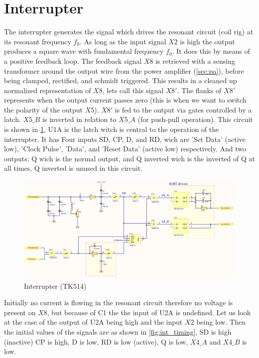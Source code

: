 \newpage
\section{Interrupter}
\label{sec:interrupter}

The interrupter generates the signal which drives the resonant circuit (coil rig) at its resonant frequency $f_0$. As long as the input signal $X2$ is high the output produces a square wave with fundamental frequency $f_0$. It does this by means of a positive feedback loop. The feedback signal $X8$ is retrieved with a sensing transformer around the output wire from the power amplifier (\cref{sec:pa}), before being clamped, rectified, and schmidt triggered. This results in a cleaned up normalized representation of $X8$, lets call this signal $X8'$. The flanks of $X8'$ represents when the output current passes zero (this is when we want to switch the polarity of the output $X5$). $X8'$ is fed to the output via gates controlled by a latch. $X5\_B$ is inverted in relation to $X5\_A$ (for push-pull operation). This circuit is shown in \cref{fig:interrupter}, U1A is the latch witch is central to the operation of the interrupter. It has Four inputs SD, CP, D, and RD, wich are 'Set Data' (active low), 'Clock Pulse', 'Data', and 'Reset Data' (active low) respectively. And two outputs; Q wich is the normal output, and Q inverted wich is the inverted of Q at all times, Q inverted is unused in this circuit.

\begin{figure}[H]
    \centering
    \includegraphics[width=0.9\textheight,angle=-90]{Skjema/TK514_Interrupter.pdf}
    \caption{Interrupter (TK514)}
    \label{fig:interrupter}
\end{figure}

\newpage

Initially no current is flowing in the resonant circuit therefore no voltage is present on $X8$, but because of C1 the the input of U2A is undefined. Let us look at the case of the output of U2A being high and the input $X2$ being low. Then the initial values of the signals are as shown in \cref{fig:int_timing}, SD is high (inactive) CP is high, D is low, RD is low (active), Q is low, $X4\_A$ and $X4\_B$ is low.

